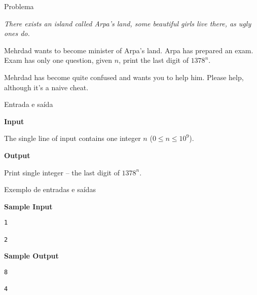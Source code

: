 
\begin{frame}[fragile]{Problema}

\textit{There exists an island called Arpa’s land, some beautiful girls live there, as ugly ones 
do.}

Mehrdad wants to become minister of Arpa’s land. Arpa has prepared an exam. Exam has only one question, given $n$, print the last digit of $1378^n$.

Mehrdad has become quite confused and wants you to help him. Please help, although it's a naive cheat.

\end{frame}

\begin{frame}[fragile]{Entrada e saída}

\textbf{Input}

The single line of input contains one integer $n$ ($0\leq n\leq 10^9$).

\vspace{0.2in}

\textbf{Output}

Print single integer -- the last digit of $1378^n$.

\end{frame}

\begin{frame}[fragile]{Exemplo de entradas e saídas}

\begin{minipage}[t]{0.45\textwidth}
\textbf{Sample Input}
\begin{verbatim}
1

2
\end{verbatim}
\end{minipage}
\begin{minipage}[t]{0.5\textwidth}
\textbf{Sample Output}
\begin{verbatim}
8

4
\end{verbatim}
\end{minipage}
\end{frame}

